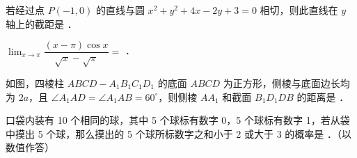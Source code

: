 \begin{question}
若经过点 $P(-1, 0)$ 的直线与圆 $x^2 + y^2 + 4x - 2y + 3 = 0$ 相切，则此直线在 $y$ 轴上的截距是 \underline{\hspace{3cm}}．

\end{question}
\begin{question}
$\lim_{x \to \pi} \dfrac{(x - \pi)\cos x}{\sqrt{x} - \sqrt{\pi}} =$ \underline{\hspace{3cm}}．

\Needspace{0.4\textheight}
\end{question}
\begin{question}
如图，四棱柱 $ABCD - A_1B_1C_1D_1$ 的底面 $ABCD$ 为正方形，侧棱与底面边长均为 $2a$，且 $\angle A_1AD = \angle A_1AB = 60^\circ$，则侧棱 $AA_1$ 和截面 $B_1D_1DB$ 的距离是 \underline{\hspace{3cm}}．
\nopagebreak[4]
\begin{center}\end{center}
\nopagebreak[4]
\end{question}
\begin{question}
口袋内装有 10 个相同的球，其中 5 个球标有数字 0，5 个球标有数字 1，若从袋中摸出 5 个球，那么摸出的 5 个球所标数字之和小于 2 或大于 3 的概率是 \underline{\hspace{3cm}}．（以数值作答）

\end{question}

